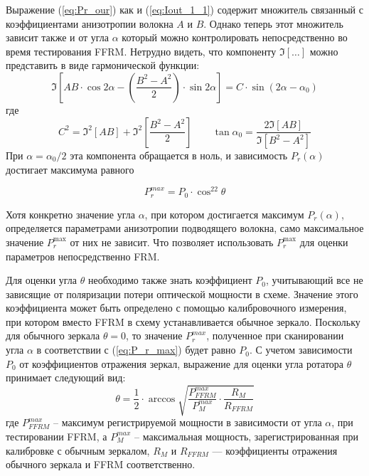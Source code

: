 \documentclass{article}
\begin{document}
Выражение (\ref{eq:Pr_our}) как и (\ref{eq:Iout_1_1}) содержит множитель связанный с коэффициентами анизотропии волокна $A$ и $B$. Однако теперь этот множитель зависит также и от угла $\alpha$ который можно контролировать непосредственно во время тестирования FFRM. Нетрудно видеть, что компоненту $\Im[\ldots]$ можно представить в виде гармонической функции:
\begin{equation}
    \Im\left[A B\cdot \cos2\alpha -\left( \frac{B^2-A^2}{2} \right)\cdot\sin2\alpha\right] = C\cdot\sin(2\alpha-\alpha_0)
\end{equation}
где
\begin{equation}
    C^2=\Im^2[AB]+\Im^2\left[\frac{B^2-A^2}{2}\right] \qquad \tan\alpha_0=\frac{2\Im[AB]}{\Im[B^2-A^2]}
\end{equation}
При $\alpha=\alpha_0/2$ эта компонента обращается в ноль, и зависимость $P_r(\alpha)$ достигает максимума равного

\begin{equation}
    \label{eq:P_r_max}
    P_r^{max}=P_0\cdot\cos^22\theta
\end{equation} 

Хотя конкретно значение угла $\alpha$, при котором достигается максимум $P_r(\alpha)$, определяется параметрами анизотропии подводящего волокна, само максимальное значение $P_r^{\max}$ от них не зависит.
Что позволяет использовать $P_r^{\max}$ для оценки параметров непосредственно FRM.

Для оценки угла $\theta$ необходимо также знать коэффициент $P_0$, учитывающий все не зависящие от поляризации потери оптической мощности в схеме.
Значение этого коэффициента может быть определено с помощью калибровочного измерения, при котором вместо FFRM в схему устанавливается обычное зеркало.
Поскольку для обычного зеркала $\theta = 0$, то значение $P_r^{max}$, полученное при сканировании угла $\alpha$ в соответствии с (\ref{eq:P_r_max}) будет равно $P_0$.
С учетом зависимости $P_0$ от коэффициентов отражения зеркал, выражение для оценки угла ротатора $\theta$ принимает следующий вид:
\begin{equation}
    \label{eq:theta}
    \theta =\frac{1}{2}\cdot\arccos\sqrt{\frac{P_{FFRM}^{max}}{P_M^{max}}\cdot\frac{R_M}{R_{FFRM}}}
\end{equation}
где $P_{FFRM}^{max}$ – максимум регистрируемой мощности в зависимости от угла $\alpha$, при тестировании FFRM, а $P_M^{max}$ – максимальная мощность, зарегистрированная при калибровке с обычным зеркалом, $R_M$ и $R_{FFRM}$ — коэффициенты отражения обычного зеркала и FFRM соответственно.
\end{document}
